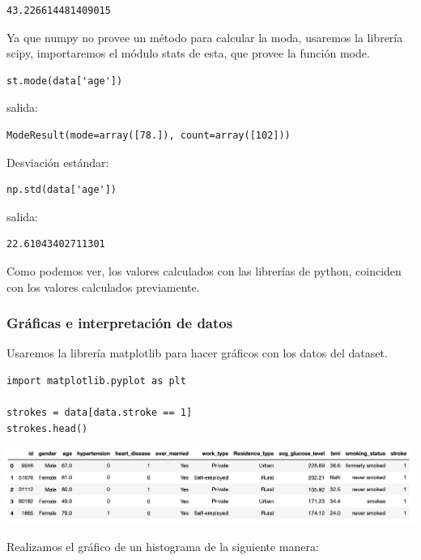 \documentclass[letter]{article}
\begin{document}
\begin{verbatim}
43.226614481409015
\end{verbatim}

Ya que numpy no provee un método para calcular la moda, usaremos la librería scipy, importaremos el módulo stats de esta, que provee la función mode.

\begin{verbatim}
st.mode(data['age'])
\end{verbatim}

salida:

\begin{verbatim}
ModeResult(mode=array([78.]), count=array([102]))
\end{verbatim}

Desviación estándar:

\begin{verbatim}
np.std(data['age'])
\end{verbatim}

salida:

\begin{verbatim}
22.61043402711301
\end{verbatim}

Como podemos ver, los valores calculados con las librerías de python, coinciden con los valores calculados previamente.

\subsubsection{Gráficas e interpretación de datos}
\label{sec:orgabae004}

Usaremos la librería matplotlib para hacer gráficos con los datos del dataset.

\begin{verbatim}
import matplotlib.pyplot as plt

strokes = data[data.stroke == 1]
strokes.head()
\end{verbatim}

\begin{center}
\includegraphics[width=.9\linewidth]{./img/tabla.png}
\end{center}

Realizamos el gráfico de un histograma de la siguiente manera:
\end{document}
